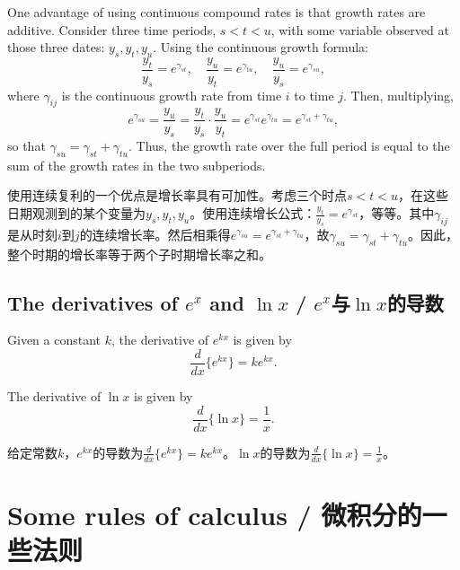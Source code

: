 \begin{original}
One advantage of using continuous compound rates is that growth rates are additive. Consider three time periods, $s < t < u$, with some variable observed at those three dates: $y_s, y_t, y_u$. Using the continuous growth formula:
\[
\frac{y_t}{y_s} = e^{\gamma_{st}},\quad \frac{y_u}{y_t} = e^{\gamma_{tu}},\quad \frac{y_u}{y_s} = e^{\gamma_{su}},
\]
where $\gamma_{ij}$ is the continuous growth rate from time $i$ to time $j$. Then, multiplying,
\[
e^{\gamma_{su}} = \frac{y_u}{y_s} = \frac{y_t}{y_s} \cdot \frac{y_u}{y_t} = e^{\gamma_{st}} e^{\gamma_{tu}} = e^{\gamma_{st} + \gamma_{tu}},
\]
so that $\gamma_{su} = \gamma_{st} + \gamma_{tu}$. Thus, the growth rate over the full period is equal to the sum of the growth rates in the two subperiods.
\end{original}
\begin{translation}
使用连续复利的一个优点是增长率具有可加性。考虑三个时点$s < t < u$，在这些日期观测到的某个变量为$y_s, y_t, y_u$。使用连续增长公式：$\frac{y_t}{y_s} = e^{\gamma_{st}}$，等等。其中$\gamma_{ij}$是从时刻$i$到$j$的连续增长率。然后相乘得$e^{\gamma_{su}} = e^{\gamma_{st} + \gamma_{tu}}$，故$\gamma_{su} = \gamma_{st} + \gamma_{tu}$。因此，整个时期的增长率等于两个子时期增长率之和。
\end{translation}

\subsection{The derivatives of $e^x$ and $\ln x$ / $e^x$与$\ln x$的导数}

\begin{original}
Given a constant $k$, the derivative of $e^{kx}$ is given by
\[
\frac{d}{dx}\{e^{kx}\} = k e^{kx}.
\]

The derivative of $\ln x$ is given by
\[
\frac{d}{dx}\{\ln x\} = \frac{1}{x}.
\]
\end{original}
\begin{translation}
给定常数$k$，$e^{kx}$的导数为$\frac{d}{dx}\{e^{kx}\} = k e^{kx}$。$\ln x$的导数为$\frac{d}{dx}\{\ln x\} = \frac{1}{x}$。
\end{translation}

\section{Some rules of calculus / 微积分的一些法则}

